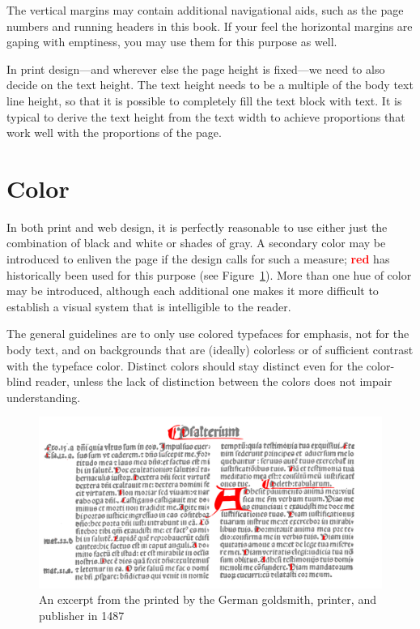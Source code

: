 The vertical margins may contain additional navigational aids, such as the page
numbers and running headers in this book. If your feel the horizontal margins
are gaping with emptiness, you may use them for this purpose as
well.~\cite[sec.\,8.5.2]{bringhurst92}

In print design---and wherever else the page height is fixed---we need to also
decide on the text height. The text height needs to be a multiple of the body
text line height, so that it is possible to completely fill the text block with
text.  It is typical to derive the text height from the text width to achieve
proportions that work well with the proportions of the
page.~\cite[sec.\,8.4.2]{bringhurst92}

\section{Color}
In both print and web design, it is perfectly reasonable to use either just the
combination of black and white or shades of gray. A secondary color may be
introduced to enliven the page if the design calls for such a measure;
\textcolor{red}{\textbf{red}} has historically been used for this purpose (see
Figure~\ref{fig:vulgate-bible}).  More than one hue of color may be introduced,
although each additional one makes it more difficult to establish a visual
system that is intelligible to the reader.

The general guidelines are to only use colored typefaces for emphasis, not for
the body text, and on backgrounds that are (ideally) colorless or of sufficient
contrast with the typeface color. Distinct colors should stay distinct even for
the color-blind reader, unless the lack of distinction between the colors does
not impair understanding.

\begin{figure}
  \includegraphics[width=\textwidth]{examples/03/1500-latin-vulgate}
  \caption{An excerpt from the  printed by
    the German goldsmith, printer, and publisher  in
    1487}
  \label{fig:vulgate-bible}
\end{figure}
